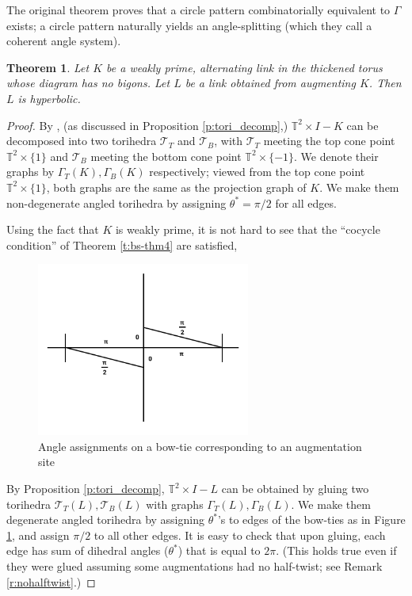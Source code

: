 \documentclass[11pt]{amsart}
\newcommand{\thmref}[1]{Theorem \ref{#1}}
\newcommand{\prpref}[1]{Proposition \ref{#1}}
\newcommand{\remref}[1]{Remark \ref{#1}}
\newcommand{\torus}{{\mathbb{T}^2}}
\newcommand{\sT}{{\mathcal{T}}}
\newcommand{\toruscomp}[1]{{\torus \times I - #1}}
\theoremstyle{plain}
\newtheorem{theorem}{Theorem}[section]
\theoremstyle{definition}
\begin{document}
The original theorem \cite[Theorem 4]{BandS}
proves that a circle pattern combinatorially equivalent to $\Gamma$
exists; a circle pattern naturally yields
an angle-splitting (which they call a coherent angle system).


\begin{theorem}
\label{t:auglink_hyp}
Let $K$ be a weakly prime, alternating link
in the thickened torus
whose diagram has no bigons.
Let $L$ be a link obtained from augmenting $K$.
Then $L$ is hyperbolic.
\end{theorem}

\begin{proof}
By \cite[Theorem 7.5]{CKP2},
(as discussed in \prpref{p:tori_decomp},)
$\toruscomp{K}$ can be decomposed
into two torihedra $\sT_T$ and $\sT_B$,
with $\sT_T$ meeting the top cone point $\torus \times \{1\}$
and $\sT_B$ meeting the bottom cone point $\torus \times \{-1\}$.
We denote their graphs by $\Gamma_T(K), \Gamma_B(K)$ respectively;
viewed from the top cone point $\torus \times \{1\}$,
both graphs are the same as the projection graph of $K$.
We make them non-degenerate angled torihedra by assigning $\theta^* = \pi/2$
for all edges.


Using the fact that $K$ is weakly prime,
it is not hard to see that the ``cocycle condition''
of \thmref{t:bs-thm4} are satisfied,


\begin{figure}
\includegraphics[width=7cm]{more_pictures/horizontal_bowtie.png}
\caption{Angle assignments on a bow-tie corresponding to an augmentation site}
\label{f:bowtie_angles}
\end{figure}

By \prpref{p:tori_decomp}, $\toruscomp{L}$ can be
obtained by gluing two torihedra $\sT_T(L),\sT_B(L)$
with graphs $\Gamma_T(L),\Gamma_B(L)$.
We make them degenerate angled torihedra by assigning $\theta^*$'s
to edges of the bow-ties as in Figure \ref{f:bowtie_angles},
and assign $\pi/2$ to all other edges.
It is easy to check that upon gluing,
each edge has sum of dihedral angles ($\theta^*$) that is equal to $2\pi$.
(This holds true even if they were glued assuming
some augmentations had no half-twist; see \remref{r:nohalftwist}.)



\end{proof}
\end{document}

